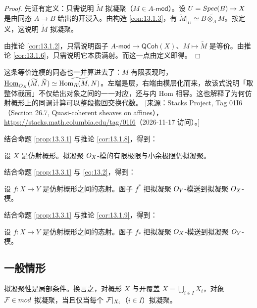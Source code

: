 \begin{proof}
先证有定义：只需说明 $\widetilde{M}$ 拟凝聚（$M\in A\text{-}\mathsf{mod}$）。设 $U=Spec(B)\to X$ 是由同态 $A\to B$ 给出的开浸入。由构造 \ref{con:13.1.3}，有 $\widetilde{M}|_U\simeq\widetilde{B\otimes_AM}$。按定义，这说明 $\widetilde{M}$ 拟凝聚。

由推论 \ref{cor:13.1.2}，只需说明函子 $A\text{-}\mathsf{mod}\to\mathsf{QCoh}(X)$、$M\mapsto\widetilde{M}$ 是等价。由推论 \ref{cor:13.1.6}，只需说明它本质满射。而这一点由定义即得。
\end{proof}

\begin{yizhu}
这条等价连模的同态也一并算进去了：$M$ 有限表现时，$\underline{\mathrm{Hom}}_{O_X}(\widetilde{M},\widetilde{N})\simeq\widetilde{\operatorname{Hom}_R(M,N)}$。左端是层，右端由模层化而来，故该式说明「取整体截面」不仅给出对象之间的一一对应，还与内 Hom 相容。这也解释了为何仿射概形上的同调计算可以整段搬回交换代数。
[来源：Stacks Project, Tag 01I6（Section 26.7, Quasi-coherent sheaves on affines），\url{https://stacks.math.columbia.edu/tag/01I6}（2026-11-17 访问）。]
\end{yizhu}

结合命题 \ref{prop:13.3.1} 与推论 \ref{cor:13.1.8}，得到：

\begin{corollary}\label{cor:13.3.2}
设 $X$ 是仿射概形。拟凝聚 $O_X$-模的有限极限与小余极限仍拟凝聚。
\end{corollary}

结合命题 \ref{prop:13.3.1} 与 \eqref{eq:13.2}，得到：

\begin{corollary}\label{cor:13.3.3}
设 $f\colon X\to Y$ 是仿射概形之间的态射。函子 $f^*$ 把拟凝聚 $O_Y$-模送到拟凝聚 $O_X$-模。
\end{corollary}

结合命题 \ref{prop:13.3.1} 与推论 \ref{cor:13.1.9}，得到：

\begin{corollary}\label{cor:13.3.4}
设 $f\colon X\to Y$ 是仿射概形之间的态射。函子 $f_*$ 把拟凝聚 $O_X$-模送到拟凝聚 $O_Y$-模。
\end{corollary}

\subsection{一般情形}\label{sec:13.4}

\begin{theorem}\label{thm:13.4.1}
拟凝聚性是局部条件。换言之，对概形 $X$ 与开覆盖 $X=\bigcup_{i\in I}X_i$，对象 $\mathcal{F}\in mod$ 拟凝聚，当且仅当每个 $\mathcal{F}|_{X_i}$（$i\in I$）拟凝聚。
\end{theorem}

